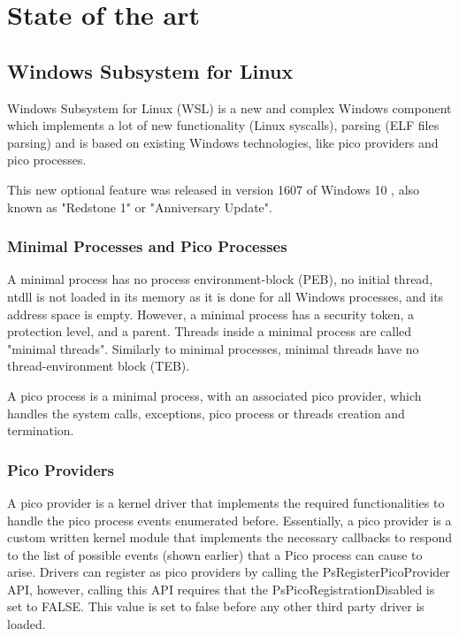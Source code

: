 \chapter{State of the art}
    \section{Windows Subsystem for Linux}
    Windows Subsystem for Linux (WSL) is a new and complex Windows component which implements a lot of new functionality (Linux syscalls),
    parsing (ELF files parsing) and is based on existing Windows technologies, like pico providers and pico processes.
    
    This new optional feature was released in version 1607 of Windows 10 \cite{WindowsInternals}, also known as "Redstone 1" or
    "Anniversary Update".

        \subsection{Minimal Processes and Pico Processes}
            A minimal process has no process environment-block (PEB), no initial thread, ntdll is not loaded in its memory as it is done
            for all Windows processes, and its address space is empty. However, a minimal process has a security token, a protection level,
            and a parent. Threads inside a minimal process are called "minimal threads". Similarly to minimal processes, minimal threads
            have no thread-environment block (TEB).

            A pico process is a minimal process, with an associated pico provider, which handles the system calls, exceptions, pico process
            or threads creation and termination.    

        \subsection{Pico Providers}
            A pico provider is a kernel driver that implements the required functionalities to handle the pico process events enumerated before.
            Essentially, a pico provider is a custom written kernel module that implements the necessary callbacks to respond to the list of
            possible events (shown earlier) that a Pico process can cause to arise\cite{WindowsInternals}. Drivers can register as pico providers by calling the
            PsRegisterPicoProvider API, however, calling this API requires that the PsPicoRegistrationDisabled is set to FALSE. This value is
            set to false before any other third party driver is loaded.
            
